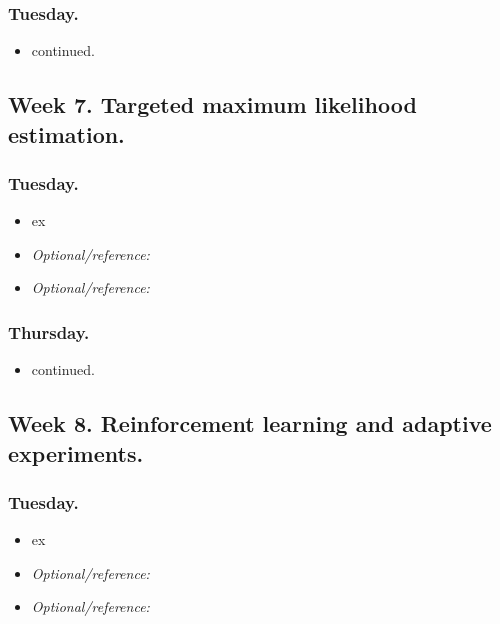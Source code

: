 \documentclass[letterpaper, 12pt, parskip=full,DIV=10]{scrartcl}
\begin{document}
\subsubsection*{Tuesday.}
\begin{itemize}
\item \cite{chernozhukov2018double} continued. 
\end{itemize}



\subsection*{Week 7. Targeted maximum likelihood estimation.}
\subsubsection*{Tuesday.}

\begin{itemize}
\item {}  ex
\item  \textit{Optional/reference:}  
\item  \textit{Optional/reference:}  
\end{itemize}

\subsubsection*{Thursday.}

\begin{itemize}
\item \cite{schuler2017targeted} continued. 
\end{itemize}

\subsection*{Week 8. Reinforcement learning and adaptive experiments.}

\subsubsection*{Tuesday.}
\begin{itemize}
\item {}  ex
\item  \textit{Optional/reference:}  
\item  \textit{Optional/reference:}  
\end{itemize}
\end{document}
